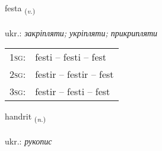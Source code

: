 \documentclass[frontgrid, backgrid]{flacards}\usepackage[]{graphicx}\usepackage[]{xcolor}
\begin{document}
\renewcommand{\flhead}{\vskip5pt \fboxsep=0pt {\small\bfseries\footnotesize Sagnorð | дієслово}}
\renewcommand{\fcfoot}{\vskip5pt \fboxsep=0pt \hspace{2pt}{\small\bfseries\footnotesize 2K}}

\renewcommand{\blhead}{\vskip5pt {\small\bfseries\footnotesize Sagnorð | дієслово }}
\renewcommand{\bcfoot}{\vskip5pt \hspace{2pt}{\small\bfseries\footnotesize 2K}}


{festa \small{\textsubscript{(\textit{v.})}} \\[1ex] %
\textphonetic{[fɛsta]} \\
ukr.: \emph{закріпляти; укріпляти; прикрипляти} \\  [2ex]
\renewcommand*{\arraystretch}{0.8}
\begin{tabular}{p{1cm}l}
\textsc{1sg}: & festi -- festi -- fest \\ 
\textsc{2sg}: & festir -- festir -- fest \\ 
\textsc{3sg}: & festir -- festi -- fest \\ 
\end{tabular}
}

\renewcommand{\flhead}{\vskip5pt \fboxsep=0pt {\small\bfseries\footnotesize Nafnorð | іменник}}
\renewcommand{\fcfoot}{\vskip5pt \fboxsep=0pt \hspace{2pt}{\small\bfseries\footnotesize 2K}}

\renewcommand{\blhead}{\vskip5pt {\small\bfseries\footnotesize Nafnorð | іменник }}
\renewcommand{\bcfoot}{\vskip5pt \hspace{2pt}{\small\bfseries\footnotesize 2K}}


{handrit \small{\textsubscript{(\textit{n.})}} \\[1ex] %
\textphonetic{[hantrɪt]} \\
ukr.: \emph{рукопис} \\  [2ex]
\renewcommand*{\arraystretch}{0.8}
}
\end{document}
